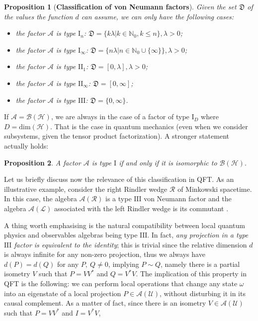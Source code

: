 \documentclass[a4paper,11pt]{article}
\newtheorem{Proposition}{Proposition}[subsection]
\begin{document}
\begin{Proposition}[\textbf{Classification of von Neumann factors}]
    Given the set $\mathfrak{D}$ of the values the function $d$ can assume, we can only have the following cases:
    \begin{itemize}
        \item the factor $\mathcal{A}$ is \textnormal{type $\mathrm{I}_n$}: $\mathfrak{D} = \{ k \lambda | k \in \mathbb{N}_0, k \leq n \}, \lambda > 0$;
        \item the factor $\mathcal{A}$ is \textnormal{type $\mathrm{I}_{\infty}$}: $\mathfrak{D} = \{ n \lambda | n \in \mathbb{N}_0 \cup \{ \infty \} \}, \lambda > 0$;
        \item the factor $\mathcal{A}$ is \textnormal{type $\mathrm{II}_1$}: $\mathfrak{D} = [0, \lambda], \lambda > 0$;
        \item the factor $\mathcal{A}$ is \textnormal{type $\mathrm{II}_{\infty}$}: $\mathfrak{D} = [0, \infty]$;
        \item the factor $\mathcal{A}$ is \textnormal{type $\mathrm{III}$}: $\mathfrak{D} = \{0, \infty \}$.
    \end{itemize}
    \label{Classification of factors}
\end{Proposition}

If $\mathcal{A} = \mathcal{B}(\mathcal{H})$, we are always in the case of a factor of type $\mathrm{I}_D$ where $D = \mathrm{dim}(\mathcal{H})$. That is the case in quantum mechanics (even when we consider subsystems, given the tensor product factorization). A stronger statement actually holds:

\begin{Proposition}
    A factor $\mathcal{A}$ is type $\mathrm{I}$ if and only if it is isomorphic to $\mathcal{B}(\mathcal{H})$.
    \label{Factors}
\end{Proposition}

Let us briefly discuss now the relevance of this classification in QFT. As an illustrative example, consider the right Rindler wedge $\mathcal{R}$ of Minkowski spacetime. In this case, the algebra $\mathcal{A}(\mathcal{R})$ is a type $\mathrm{III}$ von Neumann factor and the algebra $\mathcal{A}(\mathcal{L})$ associated with the left Rindler wedge is its commutant \cite{Araki}.

A thing worth emphasising is the natural compatibility between local quantum physics and observables algebras being type $\mathrm{III}$. In fact, \textit{any projection in a type $\mathrm{III}$ factor is equivalent to the identity}; this is trivial since the relative dimension $d$ is always infinite for any non-zero projection, thus we always have $d(P) = d(Q)$ for any $P, \ Q \neq 0$, implying $P \sim Q$, namely there is a partial isometry $V$ such that $P = VV^*$ and $Q = V^* V$. The implication of this property in QFT is the following: we can perform local operations that change any state $\omega$ into an eigenstate of a local projection $P \in \mathcal{A}(\mathcal{U})$, without disturbing it in its causal complement. As a matter of fact, since there is an isometry $V \in \mathcal{A}(\mathcal{U})$ such that $P = V V^*$ and $I = V^* V$,
\end{document}
